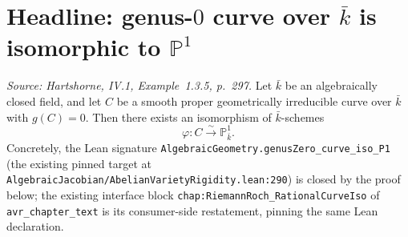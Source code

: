 \section{Headline: genus-\(0\) curve over \(\bar k\) is isomorphic to \(\mathbb P^1\)}
\begin{theorem}
  \label{thm:genus_zero_curve_iso_p1}
  
  \textit{Source: Hartshorne, IV.1, Example~1.3.5, p.~297.}
  Let \(\bar k\) be an algebraically closed field, and let \(C\) be a smooth
  proper geometrically irreducible curve over \(\bar k\) with \(g(C) = 0\).
  Then there exists an isomorphism of \(\bar k\)-schemes
  \[
    \varphi \colon C \stackrel{\sim}{\longrightarrow} \mathbb P^1_{\bar k}.
  \]
  Concretely, the Lean signature
  \texttt{AlgebraicGeometry.genusZero\_curve\_iso\_P1} (the existing pinned
  target at \texttt{AlgebraicJacobian/AbelianVarietyRigidity.lean:290}) is
  closed by the proof below; the existing interface block
  \texttt{chap:RiemannRoch_RationalCurveIso} of
  \texttt{avr_chapter_text} is its consumer-side restatement,
  pinning the same Lean declaration.
\end{theorem}
